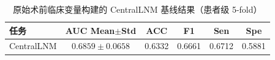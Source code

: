 \begin{table}[H]
\centering
\caption{原始术前临床变量构建的 CentralLNM 基线结果（患者级 5-fold）}
\label{tab:raw_clinical_central}
\begin{tabular}{lccccc}
\toprule
任务 & AUC Mean$\pm$Std & ACC & F1 & Sen & Spe \\
\midrule
CentralLNM & $0.6859\pm0.0658$ & 0.6332 & 0.6661 & 0.6712 & 0.5881 \\
\bottomrule
\end{tabular}
\end{table}
